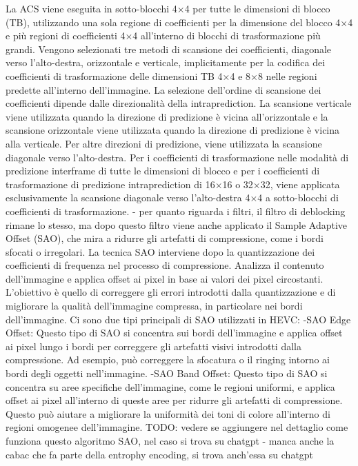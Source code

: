 \documentclass[a4paper,12pt, oneside]{article}
\begin{document}
La ACS viene eseguita in sotto-blocchi 4×4 per tutte le dimensioni di blocco (TB), utilizzando una sola regione di coefficienti per la dimensione del blocco 4×4 e più regioni di coefficienti 4×4 all'interno di blocchi di trasformazione più grandi. Vengono selezionati tre metodi di scansione dei coefficienti, diagonale verso l'alto-destra, orizzontale e verticale, implicitamente per la codifica dei coefficienti di trasformazione delle dimensioni TB 4×4 e 8×8 nelle regioni predette all'interno dell'immagine. La selezione dell'ordine di scansione dei coefficienti dipende dalle direzionalità della intraprediction. La scansione verticale viene utilizzata quando la direzione di predizione è vicina all'orizzontale e la scansione orizzontale viene utilizzata quando la direzione di predizione è vicina alla verticale. Per altre direzioni di predizione, viene utilizzata la scansione diagonale verso l'alto-destra. Per i coefficienti di trasformazione nelle modalità di predizione interframe di tutte le dimensioni di blocco e per i coefficienti di trasformazione di predizione intraprediction di 16×16 o 32×32, viene applicata esclusivamente la scansione diagonale verso l'alto-destra 4×4 a sotto-blocchi di coefficienti di trasformazione.
- per quanto riguarda i filtri, il filtro di deblocking rimane lo stesso, ma dopo questo filtro viene anche applicato il Sample Adaptive Offset (SAO), che mira a ridurre gli artefatti di compressione, come i bordi sfocati o irregolari.
La tecnica SAO interviene dopo la quantizzazione dei coefficienti di frequenza nel processo di compressione. Analizza il contenuto dell'immagine e applica offset ai pixel in base ai valori dei pixel circostanti. L'obiettivo è quello di correggere gli errori introdotti dalla quantizzazione e di migliorare la qualità dell'immagine compressa, in particolare nei bordi dell'immagine.
Ci sono due tipi principali di SAO utilizzati in HEVC:
        -SAO Edge Offset: Questo tipo di SAO si concentra sui bordi dell'immagine e applica offset ai pixel lungo i bordi per correggere gli artefatti visivi introdotti dalla compressione. Ad esempio, può correggere la sfocatura o il ringing intorno ai bordi degli oggetti nell'immagine.
        -SAO Band Offset: Questo tipo di SAO si concentra su aree specifiche dell'immagine, come le regioni uniformi, e applica offset ai pixel all'interno di queste aree per ridurre gli artefatti di compressione. Questo può aiutare a migliorare la uniformità dei toni di colore all'interno di regioni omogenee dell'immagine.
TODO: vedere se aggiungere nel dettaglio come funziona questo algoritmo SAO, nel caso si trova su chatgpt
- manca anche la cabac che fa parte della entrophy encoding, si trova anch'essa su chatgpt
\end{document}
